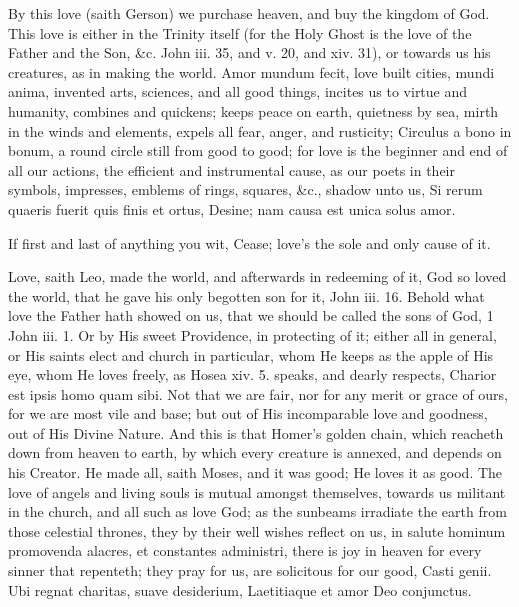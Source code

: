 {By this love (saith Gerson) we purchase heaven, and buy the
kingdom of God. This love is either in the Trinity itself (for
the Holy Ghost is the love of the Father and the Son, \&c. John iii. 35,
and v. 20, and xiv. 31), or towards us his creatures, as in making the
world. Amor mundum fecit, love built cities, mundi anima, invented
arts, sciences, and all good things, incites us to virtue and
humanity, combines and quickens; keeps peace on earth, quietness by
sea, mirth in the winds and elements, expels all fear, anger, and
rusticity; Circulus a bono in bonum, a round circle still from good to
good; for love is the beginner and end of all our actions, the
efficient and instrumental cause, as our poets in their symbols,
impresses, emblems of rings, squares, \&c., shadow unto us,
Si rerum quaeris fuerit quis finis et ortus,
Desine; nam causa est unica solus amor.

If first and last of anything you wit,
Cease; love's the sole and only cause of it.

Love, saith Leo, made the world, and afterwards in redeeming of
it, God so loved the world, that he gave his only begotten son for it,
John iii. 16. Behold what love the Father hath showed on us, that we
should be called the sons of God, 1 John iii. 1. Or by His sweet
Providence, in protecting of it; either all in general, or His saints
elect and church in particular, whom He keeps as the apple of His eye,
whom He loves freely, as Hosea xiv. 5. speaks, and dearly respects,
Charior est ipsis homo quam sibi. Not that we are fair, nor for
any merit or grace of ours, for we are most vile and base; but out of
His incomparable love and goodness, out of His Divine Nature. And this
is that Homer's golden chain, which reacheth down from heaven to earth,
by which every creature is annexed, and depends on his Creator. He made
all, saith Moses, and it was good; He loves it as good.
The love of angels and living souls is mutual amongst themselves,
towards us militant in the church, and all such as love God; as the
sunbeams irradiate the earth from those celestial thrones, they by
their well wishes reflect on us, in salute hominum promovenda
alacres, et constantes administri, there is joy in heaven for every
sinner that repenteth; they pray for us, are solicitous for our good,
Casti genii.
Ubi regnat charitas, suave desiderium,
Laetitiaque et amor Deo conjunctus.

}
